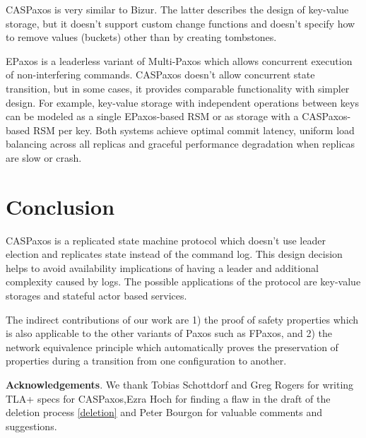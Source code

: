 \documentclass[12pt]{article}
\theoremstyle{definition}
\begin{document}
CASPaxos is very similar to Bizur\cite{bizur}. The latter describes the design of key-value storage, but it doesn't support custom change functions and doesn't specify how to remove values (buckets) other than by creating tombstones.

EPaxos\cite{epaxos} is a leaderless variant of Multi-Paxos which allows concurrent execution of non-interfering commands. CASPaxos doesn't allow concurrent state transition, but in some cases, it provides comparable functionality with simpler design. For example, key-value storage with independent operations between keys can be modeled as a single EPaxos-based RSM or as storage with a CASPaxos-based RSM per key. Both systems achieve optimal commit latency, uniform load balancing across all replicas and graceful performance degradation when replicas are slow or crash.

\section{Conclusion}

CASPaxos is a replicated state machine protocol which doesn't use leader election and replicates state instead of the command log. This design decision helps to avoid availability implications of having a leader and additional complexity caused by logs. The possible applications of the protocol are key-value storages and stateful actor based services.

The indirect contributions of our work are 1) the proof of safety properties which is also applicable to the other variants of Paxos such as FPaxos, and 2) the network equivalence principle which automatically proves the preservation of properties during a transition from one configuration to another.

{\bf Acknowledgements}. We thank Tobias Schottdorf and Greg Rogers for writing TLA+ specs for CASPaxos,Ezra Hoch for finding a flaw in the draft of the deletion process \ref{deletion} and Peter Bourgon for valuable comments and suggestions.




\newpage
\end{document}
